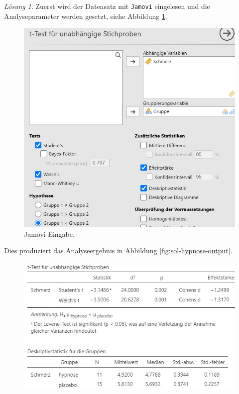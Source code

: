 \documentclass[
]{book}
\theoremstyle{definition}
\theoremstyle{definition}
\theoremstyle{definition}
\theoremstyle{definition}
\theoremstyle{remark}
\newtheorem*{solution}{Lösung}
\begin{document}
\begin{solution}

Zuerst wird der Datensatz mit \texttt{Jamovi} eingelesen und die Analyseparameter werden gesetzt, siehe Abbildung \ref{fig:sol-hypnose-input}.

\begin{figure}

{\centering \includegraphics[width=1\linewidth]{figures/06-exr-hypnose-jmv-input} 

}

\caption{Jamovi Eingabe.}\label{fig:sol-hypnose-input}
\end{figure}

Dies produziert das Analyseergebnis in Abbildung \ref{fig:sol-hypnose-output}.

\begin{figure}

{\centering \includegraphics[width=1\linewidth]{figures/06-exr-hypnose-jmv-output} 

}
\end{figure}
\end{solution}
\end{document}
